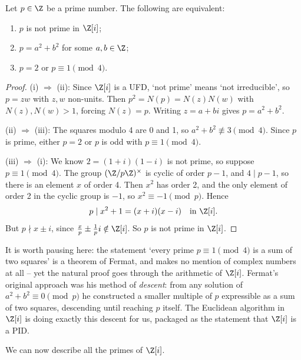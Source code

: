 \begin{proposition}
	Let $p \in \Z$ be a prime number. The following are equivalent:
	\begin{enumerate}[label=(\roman*)]
		\item $p$ is not prime in $\Z[i]$;
		\item $p = a^2 + b^2$ for some $a, b \in \Z$;
		\item $p = 2$ or $p \equiv 1 \pmod 4$.
	\end{enumerate}
\end{proposition}
\begin{proof}
	(i) $\Rightarrow$ (ii): Since $\Z[i]$ is a UFD, `not prime' means `not irreducible', so $p = zw$ with $z, w$ non-units. Then $p^2 = N(p) = N(z)N(w)$ with $N(z), N(w) > 1$, forcing $N(z) = p$. Writing $z = a + bi$ gives $p = a^2 + b^2$.

	(ii) $\Rightarrow$ (iii): The squares modulo 4 are 0 and 1, so $a^2 + b^2 \not\equiv 3 \pmod 4$. Since $p$ is prime, either $p = 2$ or $p$ is odd with $p \equiv 1 \pmod 4$.

	(iii) $\Rightarrow$ (i): We know $2 = (1+i)(1-i)$ is not prime, so suppose $p \equiv 1 \pmod 4$. The group $(\Z/p\Z)^{\times}$ is cyclic of order $p - 1$, and $4 \mid p - 1$, so there is an element $x$ of order 4. Then $x^2$ has order 2, and the only element of order 2 in the cyclic group is $-1$, so $x^2 \equiv -1 \pmod p$. Hence
	$$
	p \mid x^2 + 1 = (x + i)(x - i) \quad \text{in } \Z[i].
	$$
	But $p \nmid x \pm i$, since $\frac{x}{p} \pm \frac{1}{p}i \notin \Z[i]$. So $p$ is not prime in $\Z[i]$.
\end{proof}

It is worth pausing here: the statement `every prime $p \equiv 1 \pmod 4$ is a sum of two squares' is a theorem of Fermat, and makes no mention of complex numbers at all -- yet the natural proof goes through the arithmetic of $\Z[i]$. Fermat's original approach was his method of \emph{descent}: from any solution of $a^2 + b^2 \equiv 0 \pmod p$ he constructed a smaller multiple of $p$ expressible as a sum of two squares, descending until reaching $p$ itself. The Euclidean algorithm in $\Z[i]$ is doing exactly this descent for us, packaged as the statement that $\Z[i]$ is a PID.

We can now describe all the primes of $\Z[i]$.


